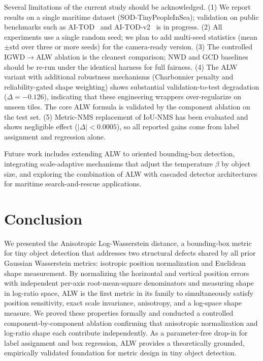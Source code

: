 \documentclass[journal]{IEEEtran}
\begin{document}
Several limitations of the current study should be acknowledged.
(1) We report results on a single maritime dataset
(SOD-TinyPeopleInSea); validation on public benchmarks such as
AI-TOD~\cite{wang2021aitod} and AI-TOD-v2~\cite{xu2022aitodv2nwd} is in
progress. (2) All experiments use a single random seed; we plan to add
multi-seed statistics (mean$\pm$std over three or more seeds) for the
camera-ready version. (3) The controlled IGWD$\to$ALW ablation is the cleanest
comparison; NWD and GCD baselines should be re-run under the identical harness
for full fairness. (4) The ALW variant with additional robustness mechanisms
(Charbonnier penalty and reliability-gated shape weighting) shows substantial
validation-to-test degradation ($\Delta=-0.126$), indicating that these
engineering wrappers over-regularize on unseen tiles. The core ALW formula is
validated by the component ablation on the test set. (5) Metric-NMS
replacement of IoU-NMS has been evaluated and shows negligible effect
($|\Delta|<0.0005$), so all reported gains come from label assignment and
regression alone.

Future work includes extending ALW to oriented bounding-box detection,
integrating scale-adaptive mechanisms that adjust the temperature $\beta$ by
object size, and exploring the combination of ALW with cascaded detector
architectures for maritime search-and-rescue applications.

\section{Conclusion}
\label{sec:conclusion}

We presented the Anisotropic Log-Wasserstein distance, a bounding-box metric
for tiny object detection that addresses two structural defects shared by all
prior Gaussian Wasserstein metrics: isotropic position normalization and
Euclidean shape measurement. By normalizing the horizontal and vertical
position errors with independent per-axis root-mean-square denominators and
measuring shape in log-ratio space, ALW is the first metric in its family to
simultaneously satisfy position sensitivity, exact scale invariance,
anisotropy, and a log-space shape measure. We proved these properties formally
and conducted a controlled component-by-component ablation confirming that
anisotropic normalization and log-ratio shape each contribute independently.
As a parameter-free drop-in for label assignment and box regression, ALW
provides a theoretically grounded, empirically validated foundation for metric
design in tiny object detection.
\end{document}
